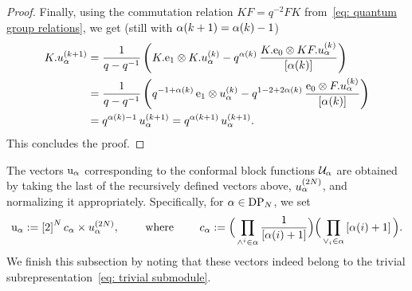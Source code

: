 \documentclass[oneside,english]{amsart}
\numberwithin{equation}{section}
\numberwithin{figure}{section}
\theoremstyle{plain}
\theoremstyle{plain}
\theoremstyle{plain}
\theoremstyle{remark}
\theoremstyle{plain}
\theoremstyle{plain}
\theoremstyle{plain}
\theoremstyle{plain}
\theoremstyle{plain}
\theoremstyle{plain}
\theoremstyle{plain}
\theoremstyle{plain}
\begin{document}
\begin{proof}
Finally, using the commutation relation $KF = q^{-2} FK$  from~\eqref{eq: quantum group relations}, we get
(still with $\alpha(k+1) = \alpha(k)-1$)
\begin{align*}
K.u_\alpha^{(k+1)} = \; & \frac{1}{q-q^{-1}}\left(
K.\mathrm{e}_1 \otimes K.u_\alpha^{(k)} 
- q^{\alpha(k)}\, 
\frac{K.\mathrm{e}_0 \otimes KF.u_\alpha^{(k)}}{\left[\alpha(k)\right]} \right) \\
= \; & \frac{1}{q-q^{-1}}\left(
q^{-1+\alpha(k)}\, \mathrm{e}_1 \otimes u_\alpha^{(k)} 
- q^{1-2+2\alpha(k)} \, \frac{\mathrm{e}_0 \otimes F.u_\alpha^{(k)}}{\left[\alpha(k)\right]} 
\right) \\
= \; & q^{\alpha(k)-1}\,u_\alpha^{(k+1)} = q^{\alpha(k+1)}\,u_\alpha^{(k+1)}.
\end{align*}
This concludes the proof.
\end{proof}

The vectors $\mathrm{u}_\alpha$ corresponding to 
the conformal block functions $\mathcal{U}_\alpha$
are obtained by taking the last
of the recursively defined vectors above, $u_\alpha^{(2N)}$, and normalizing it appropriately.
Specifically, for 
$\alpha \in \mathrm{DP}_N$, we set
\begin{align}\label{eq: coblobas vectors}
\Coblobastwodim_\alpha %
:= \qnum{2}^N \NormalizationConstant_\alpha \times u_{\alpha}^{(2N)},
\qquad \text{ where } \qquad
\NormalizationConstant_\alpha:=
\Big( \prod_{\upwedgeat{i} \in \alpha} \frac{1}{\qnum{\alpha(i)+1}} \Big)
\Big( \prod_{\downwedgeat{i} \in \alpha} \qnum{\alpha(i)+1} \Big) .
\end{align}
We finish this subsection by noting that these vectors indeed belong
to the trivial subrepresentation~\eqref{eq: trivial submodule}.
\end{document}
